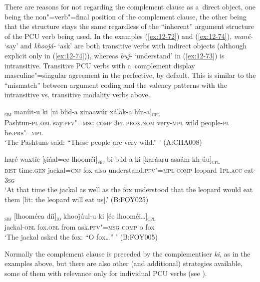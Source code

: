 There are reasons for not regarding the complement clause as a~direct object, one being the non"=verb"=final position of the complement clause, the other being that the structure stays the same regardless of the ``inherent'' argument structure of the PCU verb being used. In the examples (\ref{ex:12-72}) and (\ref{ex:12-74}), \textit{mané-} `say' and \textit{khooǰá-} `ask' are both transitive verbs with indirect objects (although explicit only in (\ref{ex:12-74})), whereas \textit{buǰ-} `understand' in (\ref{ex:12-73}) is intransitive. Transitive PCU verbs with a~complement display masculine"=singular agreement in the perfective, by default. This is similar to the ``mismatch'' between argument coding and the valency patterns with the intransitive vs. transitive modality verbs above.

\begin{exe}
\ex
\label{ex:12-72}
\gll [ɡhueeṇíi-am]\textsubscript{\textsc{sbj}} maníit-u ki [ni bíiḍ-a zinaawúr xálak-a hín-a]\textsubscript{\textsc{cpl}} \\
Pashtun-\textsc{pl.obl} say.\textsc{pfv"=msg} \textsc{c}\textsc{om}\textsc{p} \textsc{3pl.prox.nom} very-\textsc{mpl}  wild people-\textsc{pl} be.\textsc{prs"=mpl} \\
\glt `The Pashtuns said: ``These people are very wild.'' ' (A:CHA008)
\end{exe}
\begin{exe}
\ex
\label{ex:12-73}
\gll haṛé waxtíe [ṣiáal=ee lhooméi]\textsubscript{\textsc{sbj}} bi búd-a ki \textsc{[}karáaṛu asaám kh-úu]\textsubscript{\textsc{cpl}} \\
\textsc{dist} time.\textsc{gen} jackal=\textsc{cnj} fox also  understand.\textsc{pfv"=mpl} \textsc{comp} leopard \textsc{1pl.acc} eat-\textsc{3sg} \\
\glt `At that time the jackal as well as the fox understood that the leopard would eat them [lit: the leopard will eat us].' (B:FOY025)
\end{exe}
\begin{exe}
\ex
\label{ex:12-74}
\gll [ṣiúul-a]\textsubscript{\textsc{sbj}} [lhooméea díi]\textsubscript{\textsc{io}} khooǰúul-u ki [ée lhooméi{\ldots}]\textsubscript{\textsc{cpl}} \\
jackal-\textsc{obl} fox.\textsc{obl} from ask.\textsc{pfv"=msg} \textsc{comp} o fox \\
\glt `The jackal asked the fox: ``O fox{\ldots}'' ' (B:FOY005)
\end{exe}

Normally the complement clause is preceded by the complementiser \textit{ki}, as in the examples above, but there are also other (and additional) strategies available, some of them with relevance only for individual PCU verbs (see ). 


